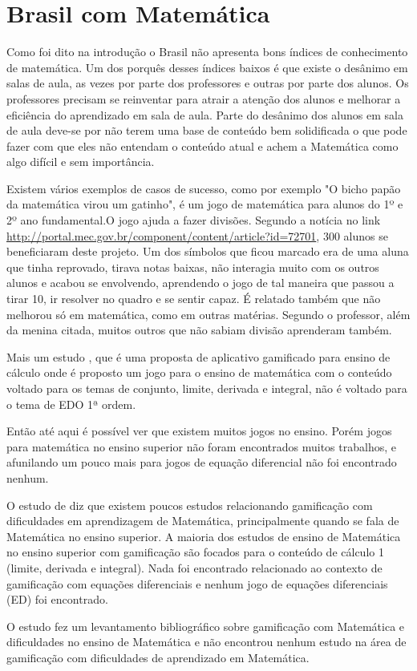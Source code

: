 
\section[Brasil com Matemática]{Brasil com Matemática}

Como foi dito na introdução o Brasil não apresenta bons índices de conhecimento de matemática. Um dos porquês desses índices baixos é que existe o desânimo em salas de aula, as vezes por parte dos professores e outras por parte dos alunos. Os professores precisam se reinventar para atrair a atenção dos alunos e melhorar a eficiência do aprendizado em sala de aula. Parte do desânimo dos alunos em sala de aula deve-se por não terem uma base de conteúdo bem solidificada o que pode fazer com que eles não entendam o conteúdo atual e achem a Matemática como algo difícil e sem importância.

Existem vários exemplos de casos de sucesso, como por exemplo "O bicho papão da matemática virou um gatinho", é um jogo de matemática para alunos do 1º e 2º ano fundamental.O jogo ajuda a fazer divisões. Segundo a notícia no link \url{http://portal.mec.gov.br/component/content/article?id=72701}, 300 alunos se beneficiaram deste projeto. Um dos símbolos que ficou marcado era de uma aluna que tinha reprovado, tirava notas baixas, não interagia muito com os outros alunos e acabou se envolvendo, aprendendo o jogo de tal maneira que passou a tirar 10, ir resolver no quadro e se sentir capaz. É relatado também que não melhorou só em matemática, como em outras matérias. Segundo o professor, além da menina citada, muitos outros que não sabiam divisão aprenderam também.

Mais um estudo \cite{appcalculo}, que é uma proposta de aplicativo gamificado para ensino de cálculo onde é proposto um jogo para o ensino de matemática com o conteúdo voltado para os temas de  conjunto, limite, derivada e integral, não é voltado para o tema de EDO 1ª ordem.

Então até aqui é possível ver que existem muitos jogos no ensino. Porém jogos para matemática no ensino superior não foram encontrados muitos trabalhos, e afunilando um pouco mais para jogos de equação diferencial não foi encontrado nenhum.


O estudo de \cite{revbibmatgam} diz que existem poucos estudos relacionando gamificação com dificuldades em aprendizagem de Matemática, principalmente quando se fala de Matemática no ensino superior. A maioria dos estudos de ensino de Matemática no ensino superior com gamificação são focados para o conteúdo de cálculo 1 (limite, derivada e integral). Nada foi encontrado relacionado ao contexto de gamificação com equações diferenciais e nenhum jogo de equações diferenciais (ED) foi encontrado.

O estudo \cite{revbibmatgam} fez um levantamento bibliográfico sobre gamificação com Matemática e dificuldades no ensino de Matemática e não encontrou nenhum estudo na área de gamificação com dificuldades de aprendizado em Matemática. 
